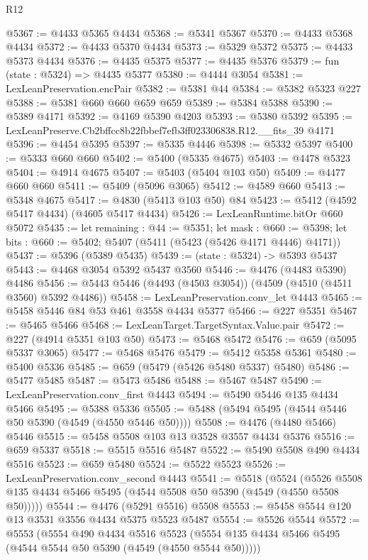 \begin{lexlean}{R12}
\begin{coremodule}
@5367 := @4433 @5365 @4434
@5368 := @5341 @5367
@5370 := @4433 @5368 @4434
@5372 := @4433 @5370 @4434
@5373 := @5329 @5372
@5375 := @4433 @5373 @4434
@5376 := @4435 @5375
@5377 := @4435 @5376
@5379 := fun (state : @5324) => @4435 @5377
@5380 := @4444 @3054
@5381 := LexLeanPreservation.encPair
@5382 := @5381 @44
@5384 := @5382 @5323 @227
@5388 := @5381 @660 @660 @659 @659
@5389 := @5384 @5388
@5390 := @5389 @4171
@5392 := @4169 @5390 @4203
@5393 := @5380 @5392
@5395 := LexLeanPreserve.Cb2bffcc8b22fbbef7efb3ff023306838.R12.__fits_39 @4171
@5396 := @4454 @5395
@5397 := @5335 @4446
@5398 := @5332 @5397
@5400 := @5333 @660 @660
@5402 := @5400 (@5335 @4675)
@5403 := @4478 @5323
@5404 := @4914 @4675
@5407 := @5403 (@5404 @103 @50)
@5409 := @4477 @660 @660
@5411 := @5409 (@5096 @3065)
@5412 := @4589 @660
@5413 := @5348 @4675
@5417 := @4830 (@5413 @103 @50) @84
@5423 := @5412 (@4592 @5417 @4434) (@4605 @5417 @4434)
@5426 := LexLeanRuntime.bitOr @660 @5072
@5435 := let remaining : @44 := @5351;
  let mask : @660 := @5398;
  let bits : @660 := @5402; @5407 (@5411 (@5423 (@5426 @4171 @4446) @4171))
@5437 := @5396 (@5389 @5435)
@5439 := (state : @5324) -> @5393 @5437
@5443 := @4468 @3054 @5392 @5437 @3560
@5446 := @4476 (@4483 @5390) @4486
@5456 := @5443 @5446 (@4493 (@4503 @3054)) (@4509 (@4510 (@4511 @3560) @5392 @4486))
@5458 := LexLeanPreservation.conv_let @4443
@5465 := @5458 @5446 @84 @53 @461 @3558 @4434 @5377
@5466 := @227 @5351
@5467 := @5465 @5466
@5468 := LexLeanTarget.TargetSyntax.Value.pair
@5472 := @227 (@4914 @5351 @103 @50)
@5473 := @5468 @5472
@5476 := @659 (@5095 @5337 @3065)
@5477 := @5468 @5476
@5479 := @5412 @5358 @5361
@5480 := @5400 @5336
@5485 := @659 (@5479 (@5426 @5480 @5337) @5480)
@5486 := @5477 @5485
@5487 := @5473 @5486
@5488 := @5467 @5487
@5490 := LexLeanPreservation.conv_first @4443
@5494 := @5490 @5446 @135 @4434 @5466
@5495 := @5388 @5336
@5505 := @5488 (@5494 @5495 (@4544 @5446 @50 @5390 (@4549 (@4550 @5446 @50))))
@5508 := @4476 (@4480 @5466) @5446
@5515 := @5458 @5508 @103 @13 @3528 @3557 @4434 @5376
@5516 := @659 @5337
@5518 := @5515 @5516 @5487
@5522 := @5490 @5508 @490 @4434 @5516
@5523 := @659 @5480
@5524 := @5522 @5523
@5526 := LexLeanPreservation.conv_second @4443
@5541 := @5518
    (@5524 (@5526 @5508 @135 @4434 @5466 @5495 (@4544 @5508 @50 @5390 (@4549 (@4550 @5508 @50)))))
@5544 := @4476 (@5291 @5516) @5508
@5553 := @5458 @5544 @120 @13 @3531 @3556 @4434 @5375 @5523 @5487
@5554 := @5526 @5544
@5572 := @5553
    (@5554
      @490
      @4434
      @5516
      @5523
      (@5554 @135 @4434 @5466 @5495 (@4544 @5544 @50 @5390 (@4549 (@4550 @5544 @50)))))

\end{coremodule}
\end{lexlean}

